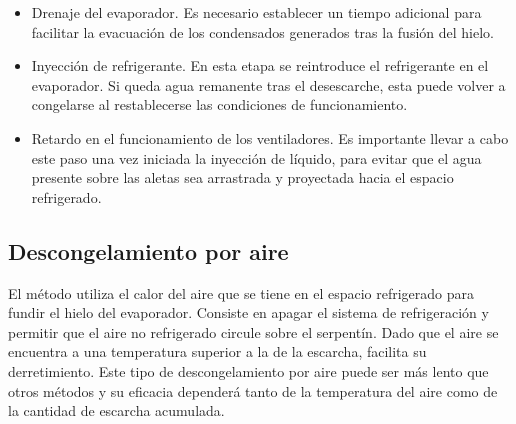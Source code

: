 \begin{itemize}
				\item Drenaje del evaporador. Es necesario establecer un tiempo adicional para facilitar la evacuación de los condensados generados tras la fusión del hielo.
				\item Inyección de refrigerante. En esta etapa se reintroduce el refrigerante en el evaporador. Si queda agua remanente tras el desescarche, esta puede volver a congelarse al restablecerse las condiciones de funcionamiento.
				\item Retardo en el funcionamiento de los ventiladores. Es importante llevar a cabo este paso una vez iniciada la inyección de líquido, para evitar que el agua presente sobre las aletas sea arrastrada y proyectada hacia el espacio refrigerado.
			\end{itemize}
			
		\subsection{Descongelamiento por aire}
		
		El método utiliza el calor del aire que se tiene en el espacio refrigerado para fundir el hielo del evaporador. Consiste en apagar el sistema de refrigeración y permitir que el aire no refrigerado circule sobre el serpentín. Dado que el aire se encuentra a una temperatura superior a la de la escarcha, facilita su derretimiento. Este tipo de descongelamiento por aire puede ser más lento que otros métodos y su eficacia dependerá tanto de la temperatura del aire como de la cantidad de escarcha acumulada.
		
